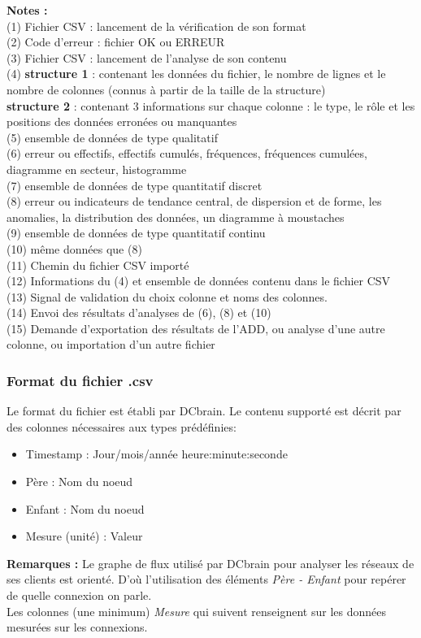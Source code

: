 				\textbf{Notes :}\\
				(1) Fichier CSV : lancement de la vérification de son format\\
				(2) Code d'erreur : fichier OK ou ERREUR\\
				(3) Fichier CSV : lancement de l'analyse de son contenu\\
				(4) \textbf{structure 1} : contenant les données du fichier, le nombre de lignes et le nombre de colonnes (connus à partir de la taille de la structure)\\
				\hspace*{1.9em} \textbf{structure 2} : contenant 3 informations sur chaque colonne : le type, le rôle et les positions des données erronées ou manquantes\\
				(5) ensemble de données de type qualitatif\\
				(6) erreur ou effectifs, effectifs cumulés, fréquences, fréquences cumulées, diagramme en secteur, histogramme\\
				(7) ensemble de données de type quantitatif discret\\
				(8) erreur ou indicateurs de tendance central, de dispersion et de forme, les anomalies, la distribution des données, un diagramme à moustaches\\
				(9) ensemble de données de type quantitatif continu\\
				(10) même données que (8)\\
				(11) Chemin du fichier CSV importé \\
				(12) Informations du (4) et ensemble de données contenu dans le fichier CSV \\
				(13) Signal de validation du choix colonne et noms des colonnes.\\
				(14) Envoi des résultats d'analyses de (6), (8) et (10)\\
				(15) Demande d'exportation des résultats de l'ADD, ou analyse d'une autre colonne, ou importation d'un autre fichier\\
			
			\subsubsection{Format du fichier .csv}
				Le format du fichier est établi par DCbrain. Le contenu supporté est décrit par des colonnes nécessaires aux types prédéfinies:\\
				\begin{itemize}
				\item Timestamp : Jour/mois/année	heure:minute:seconde
				\item Père : Nom du noeud
				\item Enfant : Nom du noeud
				\item Mesure (unité) : Valeur
				\end{itemize}
				\textbf{Remarques :} Le graphe de flux utilisé par DCbrain pour analyser les réseaux de ses clients est orienté. D'où l'utilisation des éléments \textit{Père - Enfant} pour repérer de quelle connexion on parle.\\
				Les colonnes (une minimum) \textit{Mesure} qui suivent renseignent sur les données mesurées sur les connexions.
				
